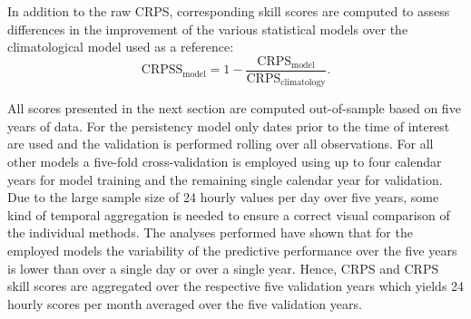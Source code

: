 \documentclass[nojss,shortnames]{jss}
\numberwithin{equation}{section}
\begin{document}
In addition to the raw CRPS, corresponding skill scores are computed to assess
differences in the improvement of the various statistical models over the
climatological model used as a reference:
\begin{equation} 
  \text{CRPSS}_{\text{model}} = 1 -
  \frac{\text{CRPS}_{\text{model}}}{\text{CRPS}_{\text{climatology}}}.
\end{equation}

All scores presented in the next section are computed out-of-sample based on
five years of data. For the persistency model only dates prior to the time of
interest are used and the validation is performed rolling over all
observations. For all other models a five-fold cross-validation is employed
using up to four calendar years for model training and the remaining single
calendar year for validation. Due to the large sample size of 24 hourly values
per day over five years, some kind of temporal aggregation is needed to ensure
a correct visual comparison of the individual methods. The analyses performed
have shown that for the employed models the variability of the predictive
performance over the five years is lower than over a single day or over a
single year. Hence, CRPS and CRPS skill scores are aggregated over the
respective five validation years which yields 24 hourly scores per month
averaged over the five validation years.
\end{document}
